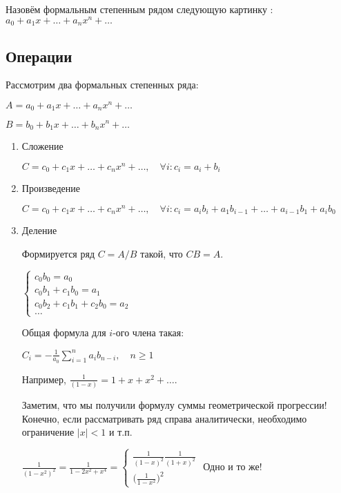 Назовём формальным степенным рядом следующую картинку :
$a_0 + a_1 x + \dots + a_n x^n + \dots$

\subsection{Операции}

Рассмотрим два формальных степенных ряда:

$A = a_0 + a_1 x + \dots + a_n x^n + \dots $

$B = b_0 + b_1 x + \dots + b_n x^n + \dots $

\begin{enumerate}
\item Сложение

$C = c_0 + c_1 x + \dots + c_n x^n + \dots , \quad \forall i : c_i = a_i + b_i$

\item Произведение

$C = c_0 + c_1 x + \dots + c_n x^n + \dots , \quad \forall i : c_i = a_i b_i + a_1 b_{i-1} + \dots + a_{i-1} b_1 + a_i b_0$

\item Деление

Формируется ряд $C = A / B$ такой, что $ CB = A $.


$\begin{cases}
c_0b_0 = a_0\\
c_0b_1 + c_1b_0 = a_1\\
c_0b_2 + c_1b_1 + c_2b_0 = a_2\\
\dots
\end{cases}
$

Общая формула для $i$-ого члена такая:

$C_i = - \frac 1 {a_0} \sum \limits _{i=1} ^n a_i b_{n-i}, \quad n \geq 1$


Например, $ \frac 1 {(1-x)} = 1 + x + x^2 + \dots $.

Заметим, что мы получили формулу суммы геометрической прогрессии! Конечно, если рассматривать ряд справа аналитически, необходимо ограничение $|x| <1 $ и т.п.

\begin{example}

$
\frac 1 {(1-x^2)^2} = \frac 1 {1 - 2x^2 + x^4} = 
\begin{cases}
\frac 1 {(1-x)^2} \frac 1 {(1+x)^2} \\
\bigg ( \frac 1 {1-x^2} \bigg ) ^2
\end{cases}
$ Одно и то же!


\end{example}
\end{enumerate}
